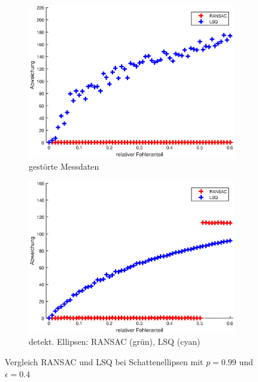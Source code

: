 \begin{figure}[!htb]
	\begin{subfigure}{.8\textwidth}
		\centering
		\includegraphics[width=\textwidth]{images/ransacEval0.eps}
		\caption{gestörte Messdaten}
	\end{subfigure}
	\begin{subfigure}{.8\textwidth}
		\centering
		\includegraphics[width=\textwidth]{images/ransacEval1.eps}
		\caption{detekt. Ellipsen: RANSAC (grün), LSQ (cyan)}
	\end{subfigure}
	\caption{Vergleich RANSAC und LSQ bei Schattenellipsen mit $p = 0.99$ und $\epsilon = 0.4$}
	\label{fig:blubbs}
\end{figure}























